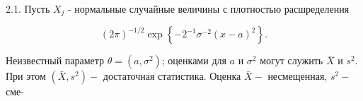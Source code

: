 \documentclass[10pt]{article}
\begin{document}
2.1. Пусть $X_{j}$ - нормальные случайные величины с плотностью расшределения



\[

(2 \pi)^{-1 / 2} \exp \left\{-2^{-1} \sigma^{-2}(x-a)^{2}\right\} .

\]



Неизвестный параметр $\theta=\left(a, \sigma^{2}\right)$; оценками для $a$ и $\sigma^{2}$ могут служить $\bar{X}$ и $s^{2}$. При этом $\left(\bar{X}, s^{2}\right)-$ достаточная статистика. Оценка $\bar{X}-$ несмещенная, $s^{2}-$ сме-
\end{document}
